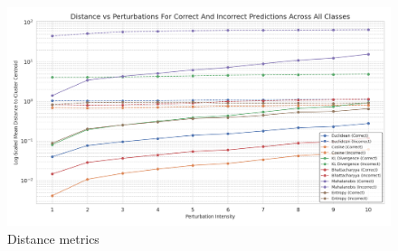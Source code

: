\begin{figure}[H]
    \centering
    \includegraphics[width=1\linewidth]{Figures/Results/Figures_uncertainty_metrics.png}
    \caption{Distance metrics}
    \label{fig:Figures_uncertainty_metrics}
\end{figure}

